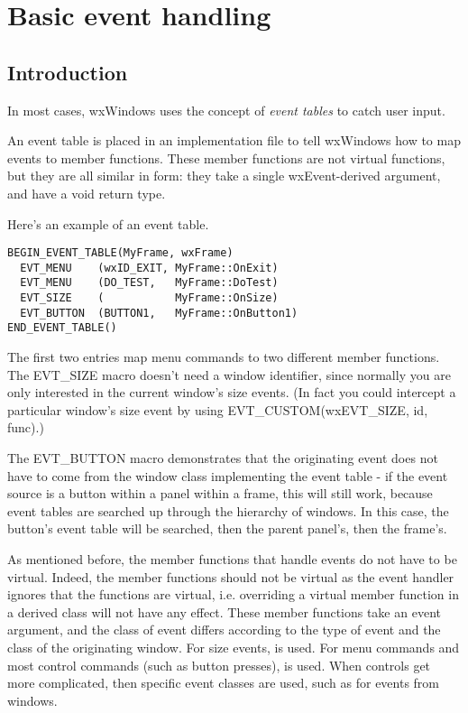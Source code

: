 \chapter{Basic event handling}\label{chapbasicevents}
%
%
\setfooter{\thepage}{}{}{}{}{\thepage}%

\section{Introduction}

In most cases, wxWindows uses the concept of {\it event tables} to catch user input.

An event table is placed in an implementation file to tell wxWindows how to map
events to member functions. These member functions are not virtual functions, but
they are all similar in form: they take a single wxEvent-derived argument, and have a void return
type.

Here's an example of an event table.

\begin{verbatim}
BEGIN_EVENT_TABLE(MyFrame, wxFrame)
  EVT_MENU    (wxID_EXIT, MyFrame::OnExit)
  EVT_MENU    (DO_TEST,   MyFrame::DoTest)
  EVT_SIZE    (           MyFrame::OnSize)
  EVT_BUTTON  (BUTTON1,   MyFrame::OnButton1)
END_EVENT_TABLE()
\end{verbatim}

The first two entries map menu commands to two different member functions. The EVT\_SIZE macro
doesn't need a window identifier, since normally you are only interested in the
current window's size events. (In fact you could intercept a particular window's size event
by using EVT\_CUSTOM(wxEVT\_SIZE, id, func).)

The EVT\_BUTTON macro demonstrates that the originating event does not have to come from
the window class implementing the event table - if the event source is a button within a panel within a frame, this will still
work, because event tables are searched up through the hierarchy of windows. In this
case, the button's event table will be searched, then the parent panel's, then the frame's.

As mentioned before, the member functions that handle events do not have to be virtual.
Indeed, the member functions should not be virtual as the event handler ignores that
the functions are virtual, i.e. overriding a virtual member function in a derived class
will not have any effect.
These member functions take an event argument, and the class of event differs according
to the type of event and the class of the originating window. For size
events,  is used. For menu commands and most control
commands (such as button presses),  is used.
When controls get more complicated, then specific event classes are used, such
as  for events from  windows.

